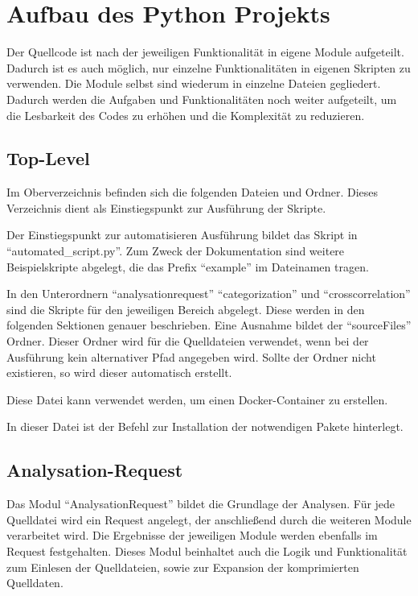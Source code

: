 \section{Aufbau des Python Projekts}
Der Quellcode ist nach der jeweiligen Funktionalität in eigene Module aufgeteilt.
Dadurch ist es auch möglich, nur einzelne Funktionalitäten in eigenen Skripten zu verwenden.
Die Module selbst sind wiederum in einzelne Dateien gegliedert.
Dadurch werden die Aufgaben und Funktionalitäten noch weiter aufgeteilt, um die Lesbarkeit des Codes zu erhöhen und die Komplexität zu reduzieren.

\subsection{Top-Level}
Im Oberverzeichnis befinden sich die folgenden Dateien und Ordner. Dieses Verzeichnis dient als Einstiegspunkt zur Ausführung der Skripte.
\begin{description}[style=nextline]
	\item[Skriptdateien] Der Einstiegspunkt zur automatisieren Ausführung bildet das Skript in \enquote{automated\_script.py}. Zum Zweck der Dokumentation sind weitere Beispielskripte abgelegt, die das Prefix \enquote{example} im Dateinamen tragen.
	\item[Unterordner] In den Unterordnern \enquote{analysationrequest} \enquote{categorization} und \enquote{crosscorrelation} sind die Skripte für den jeweiligen Bereich abgelegt. Diese werden in den folgenden Sektionen genauer beschrieben. Eine Ausnahme bildet der \enquote{sourceFiles} Ordner. Dieser Ordner wird für die Quelldateien verwendet, wenn bei der Ausführung kein alternativer Pfad angegeben wird. Sollte der Ordner nicht existieren, so wird dieser automatisch erstellt.
	\item[Docker-File] Diese Datei kann verwendet werden, um einen Docker-Container zu erstellen.
	\item[Dependencies.txt] In dieser Datei ist der Befehl zur Installation der notwendigen Pakete hinterlegt.
\end{description}

\subsection{Analysation-Request}
Das Modul \enquote{AnalysationRequest} bildet die Grundlage der Analysen.
Für jede Quelldatei wird ein Request angelegt, der anschließend durch die weiteren Module verarbeitet wird.
Die Ergebnisse der jeweiligen Module werden ebenfalls im Request festgehalten.
Dieses Modul beinhaltet auch die Logik und Funktionalität zum Einlesen der Quelldateien, sowie zur Expansion der komprimierten Quelldaten. 

